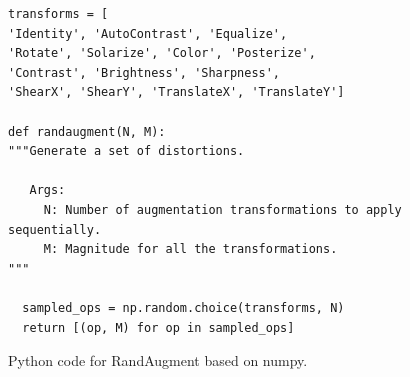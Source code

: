 \begin{figure}[t]
\begin{lstlisting}
transforms = [
'Identity', 'AutoContrast', 'Equalize', 
'Rotate', 'Solarize', 'Color', 'Posterize',
'Contrast', 'Brightness', 'Sharpness', 
'ShearX', 'ShearY', 'TranslateX', 'TranslateY']

def randaugment(N, M): 
"""Generate a set of distortions.

   Args:
     N: Number of augmentation transformations to apply sequentially.
     M: Magnitude for all the transformations.
"""

  sampled_ops = np.random.choice(transforms, N)
  return [(op, M) for op in sampled_ops]

\end{lstlisting}
\caption{Python code for RandAugment based on numpy.}
\label{fig:algorithm}
\end{figure}